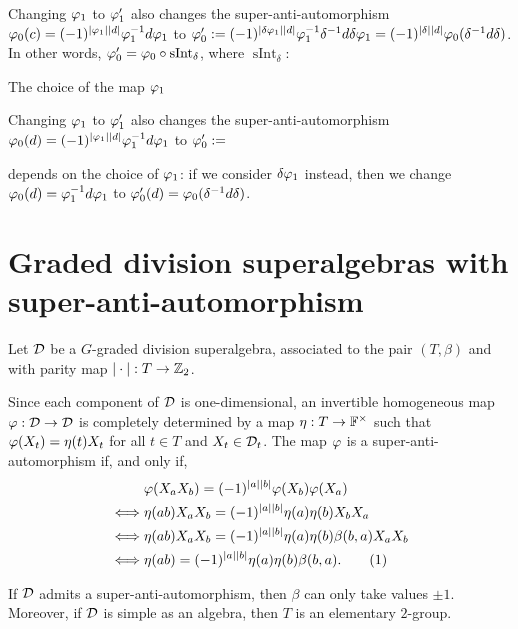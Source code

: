 \documentclass{amsbook}
\newcommand\numberthis{\addtocounter{equation}{1}\tag{\theequation}}
\begin{document}
Changing $\varphi_1$ to $\varphi_1'$ also changes the super-anti-automorphism $\varphi_0 (c) = (-1)^{|\varphi_1||d|}\varphi_1^{-1} d \varphi_1$ to $\varphi_0':= (-1)^{|\delta\varphi_1||d|}\varphi_1^{-1}\delta^{-1} d \delta\varphi_1= (-1)^{|\delta||d|} \varphi_0(\delta^{-1} d \delta)$. In other words, $\varphi_0' = \varphi_0 \circ \operatorname{sInt}_\delta$, where $\operatorname{sInt}_\delta: $

The choice of the map $\varphi_1$ 

Changing $\varphi_1$ to $\varphi_1'$ also changes the super-anti-automorphism $\varphi_0(d) = (-1)^{|\varphi_1||d|}\varphi_1^{-1} d \varphi_1$ to $\varphi_0':= $


depends on the choice of $\varphi_1$: if we consider $\delta\varphi_1$ instead, then we change $\varphi_0(d) = \varphi_1^{-1} d \varphi_1$ to $\varphi_0'(d) = \varphi_0(\delta^{-1} d \delta)$.

\section{Graded division superalgebras with super-anti-automorphism}


Let $\mathcal{D}$ be a $G$-graded division superalgebra, associated to the pair $(T, \beta)$ and with parity map $| \cdot |: T \to \mathbb{Z}_2$.

Since each component of $\mathcal{D}$ is one-dimensional, an invertible homogeneous map $\varphi: \mathcal{D} \to \mathcal{D}$ is completely determined by a map $\eta: T \to \mathbb{F}^\times$ such that $\varphi(X_t) = \eta(t) X_t$ for all $t\in T$ and $X_t\in \mathcal{D}_t$.
The map $\varphi$ is a super-anti-automorphism if, and only if,
%
\begin{align*}
    &\vphi(X_a X_b) = (-1)^{|a||b|} \vphi(X_b) \vphi(X_a)\\ \iff& \eta(ab)X_a X_b = (-1)^{|a||b|} \eta(a) \eta(b) X_b X_a\\ \iff& \eta(ab)X_a X_b = (-1)^{|a||b|} \eta(a) \eta(b) \beta(b,a) X_a X_b\\ \iff& \eta(ab) = (-1)^{|a||b|} \eta(a) \eta(b) \beta(b,a). \numberthis \label{eq:eta-super-anti-auto}
\end{align*}

\begin{prop}
    If $\mathcal{D}$ admits a super-anti-automorphism, then $\beta$ can only take values $\pm 1$.
    Moreover, if $\mathcal{D}$ is simple as an algebra, then $T$ is an elementary $2$-group.
\end{prop}
\end{document}

